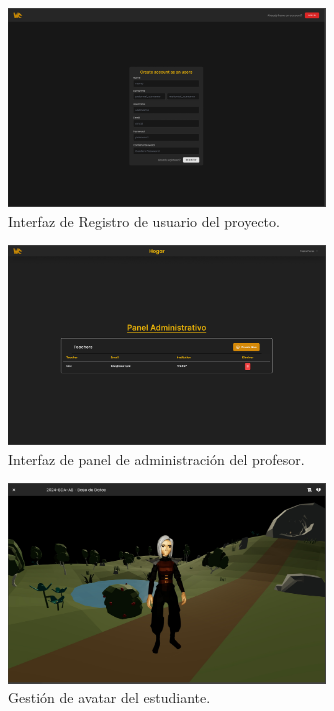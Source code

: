 \begin{figure}[H]
	\centering
	\includegraphics[width=0.75\textwidth]{images/pagina_web_registro.png}
	\caption{Interfaz de Registro de usuario del proyecto.}
	\label{fig:ui-register}
\end{figure}
\begin{figure}[H]
	\centering
	\includegraphics[width=0.75\textwidth]{images/pagina_web_panel-administrativo.png}
	\caption{Interfaz de panel de administración del profesor.}
	\label{fig:ui-profesor}
\end{figure}
\begin{figure}[H]
	\centering
	\includegraphics[width=0.75\textwidth]{images/pagina_web_vista-alumno.png}
	\caption{Gestión de avatar del estudiante.}
	\label{fig:ui-avatar}
\end{figure}

